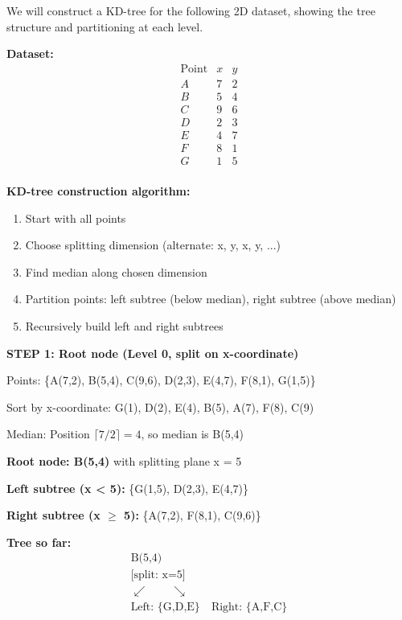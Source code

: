 \documentclass[12pt]{article}
\begin{document}
\begin{solution}
We will construct a KD-tree for the following 2D dataset, showing the tree structure and partitioning at each level.

\textbf{Dataset:}
\[
\begin{array}{c|cc}
\text{Point} & x & y \\
\hline
A & 7 & 2 \\
B & 5 & 4 \\
C & 9 & 6 \\
D & 2 & 3 \\
E & 4 & 7 \\
F & 8 & 1 \\
G & 1 & 5 \\
\end{array}
\]

\textbf{KD-tree construction algorithm:}
\begin{enumerate}
    \item Start with all points
    \item Choose splitting dimension (alternate: x, y, x, y, ...)
    \item Find median along chosen dimension
    \item Partition points: left subtree (below median), right subtree (above median)
    \item Recursively build left and right subtrees
\end{enumerate}

\textbf{STEP 1: Root node (Level 0, split on x-coordinate)}

Points: \{A(7,2), B(5,4), C(9,6), D(2,3), E(4,7), F(8,1), G(1,5)\}

Sort by x-coordinate: G(1), D(2), E(4), B(5), A(7), F(8), C(9)

Median: Position \(\lceil 7/2 \rceil = 4\), so median is B(5,4)

\textbf{Root node: B(5,4)} with splitting plane x = 5

\textbf{Left subtree (x < 5):} \{G(1,5), D(2,3), E(4,7)\}

\textbf{Right subtree (x $\geq$ 5):} \{A(7,2), F(8,1), C(9,6)\}

\textbf{Tree so far:}
\[
\begin{array}{c}
\text{B(5,4)} \\
\text{[split: x=5]} \\
\swarrow \qquad \searrow \\
\text{Left: \{G,D,E\}} \quad \text{Right: \{A,F,C\}}
\end{array}
\]


\end{solution}
\end{document}
